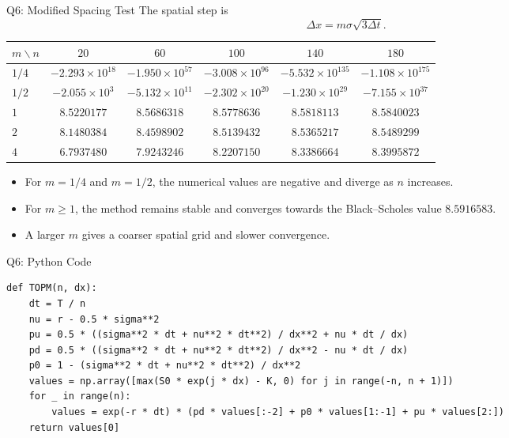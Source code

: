 \documentclass{beamer}
\begin{document}
\begin{frame}{Q6: Modified Spacing Test}
The spatial step is
\[
\Delta x=m\sigma\sqrt{3\Delta t}.
\]
\begin{table}
\centering
\scriptsize
\setlength{\tabcolsep}{4.5pt}
\renewcommand{\arraystretch}{1.25}
\begin{tabular}{@{}lccccc@{}}
\toprule
\(m\backslash n\)
& \(20\) & \(60\) & \(100\) & \(140\) & \(180\)\\
\midrule

\(1/4\)
& \(-2.293\times10^{18}\)
& \(-1.950\times10^{57}\)
& \(-3.008\times10^{96}\)
& \(-5.532\times10^{135}\)
& \(-1.108\times10^{175}\)\\

\(1/2\)
& \(-2.055\times10^{3}\)
& \(-5.132\times10^{11}\)
& \(-2.302\times10^{20}\)
& \(-1.230\times10^{29}\)
& \(-7.155\times10^{37}\)\\

\(1\)
& \(8.5220177\)
& \(8.5686318\)
& \(8.5778636\)
& \(8.5818113\)
& \(8.5840023\)\\

\(2\)
& \(8.1480384\)
& \(8.4598902\)
& \(8.5139432\)
& \(8.5365217\)
& \(8.5489299\)\\

\(4\)
& \(6.7937480\)
& \(7.9243246\)
& \(8.2207150\)
& \(8.3386664\)
& \(8.3995872\)\\

\bottomrule
\end{tabular}
\end{table}

\begin{itemize}
    \item For \(m=1/4\) and \(m=1/2\), the numerical values are
    negative and diverge as \(n\) increases.
    \item For \(m\geq1\), the method remains stable and converges
    towards the Black--Scholes value \(8.5916583\).
    \item A larger \(m\) gives a coarser spatial grid and slower convergence.
\end{itemize}
\end{frame}

\begin{frame}[fragile]{Q6: Python Code}
\begin{lstlisting}
def TOPM(n, dx):
    dt = T / n
    nu = r - 0.5 * sigma**2
    pu = 0.5 * ((sigma**2 * dt + nu**2 * dt**2) / dx**2 + nu * dt / dx)
    pd = 0.5 * ((sigma**2 * dt + nu**2 * dt**2) / dx**2 - nu * dt / dx)
    p0 = 1 - (sigma**2 * dt + nu**2 * dt**2) / dx**2
    values = np.array([max(S0 * exp(j * dx) - K, 0) for j in range(-n, n + 1)])
    for _ in range(n):
        values = exp(-r * dt) * (pd * values[:-2] + p0 * values[1:-1] + pu * values[2:])
    return values[0]
\end{lstlisting}
\end{frame}
\end{document}
